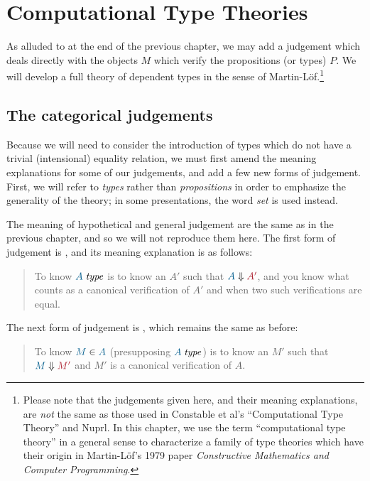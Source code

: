 \chapter{Computational Type Theories}

As alluded to at the end of the previous chapter, we may add a judgement
 which deals directly with the objects $M$ which verify the
propositions (or types) $P$. We will develop a full theory of dependent types
in the sense of Martin-L\"of.\footnote{Please note that the judgements given here, and
their meaning explanations, are \emph{not} the same as those used in Constable
et al's ``Computational Type Theory'' and Nuprl. In this chapter, we use the
term ``computational type theory'' in a general sense to characterize a family
of type theories which have their origin in Martin-L\"of's 1979 paper
\emph{Constructive Mathematics and Computer Programming}.}

\section{The categorical judgements}

Because we will need to consider the introduction of types which do not have a
trivial (intensional) equality relation, we must first amend the meaning
explanations for some of our judgements, and add a few new forms of judgement.
First, we will refer to \emph{types} rather than \emph{propositions} in order
to emphasize the generality of the theory; in some presentations, the word
\emph{set} is used instead.

The meaning of hypothetical and general judgement are the same as in
the previous chapter, and so we will not reproduce them here. The
first form of judgement is , and its meaning
explanation is as follows:

\begin{quote}
  To know $\isset{A}$ is to know an $A'$ such that $\reduce{A}{A'}$,
  and you know what counts as a canonical verification of $A'$ and when
  two such verifications are equal.
\end{quote}

The next form of judgement is , which remains
the same as before:

\begin{quote}
  To know $\ver{M}{A}$ (presupposing $\isset{A}$) is to know an $M'$ such that
  $\reduce{M}{M'}$ and $M'$ is a canonical verification of $A$.
\end{quote}

